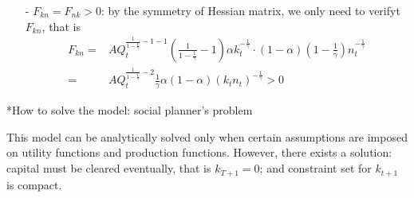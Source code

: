 \documentclass[10pt,landscape,a4paper]{article}
\makeatletter
\renewcommand{\subsection}{\@startsection{subsection}{1}{0mm}{.2ex}{.2ex}{\small\bfseries}}
\makeatother
\begin{document}
\begin{multicols*}{3}
\begin{itemize}
\begin{itemize}
        \item[-] $F_{kn}=F_{nk}>0$: by the symmetry of Hessian matrix, we only need to verifyt $F_{kn}$, that is
        \begin{align*}
            F_{kn} =& AQ_t^{\frac{1}{1-\frac{1}{\gamma}}-1-1}\left(\frac{1}{1-\frac{1}{\gamma}}-1\right)\alpha k_t^{-\frac{1}{\gamma}}\cdot (1-\alpha)(1-\frac{1}{\gamma})n_t^{-\frac{1}{\gamma}}\\
            =& AQ_t^{\frac{1}{1-\frac{1}{\gamma}}-2}\frac{1}{\gamma}\alpha(1-\alpha)(k_tn_t)^{-\frac{1}{\gamma}}>0
        \end{align*}
    \end{itemize}
\end{itemize}

\subsection*{How to solve the model: social planner's problem}

This model can be analytically solved only when certain assumptions are imposed on utility functions and production functions. However, there exists a solution: capital must be cleared eventually, that is $k_{T+1}=0$; and constraint set for $k_{t+1}$ is compact.

\vspace{2pt}



\end{multicols*}
\end{document}
